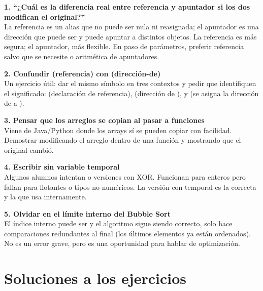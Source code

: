 \documentclass[12pt, oneside]{article}
\begin{document}
\begin{notaprofesor}

\textbf{1. ``¿Cuál es la diferencia real entre referencia y apuntador si los dos modifican el original?''}\\
La referencia es un alias que no puede ser nula ni reasignada; el apuntador es
una dirección que puede ser  y puede apuntar a distintos objetos.
La referencia es más segura; el apuntador, más flexible. En paso de parámetros,
preferir referencia salvo que se necesite  o aritmética de apuntadores.

\vspace{0.6em}
\textbf{2. Confundir  (referencia) con  (dirección-de)}\\
Un ejercicio útil: dar el mismo símbolo en tres contextos y pedir que identifiquen
el significado:  (declaración de referencia), 
(dirección de ), y  (se asigna la dirección de  a ).

\vspace{0.6em}
\textbf{3. Pensar que los arreglos se copian al pasar a funciones}\\
Viene de Java/Python donde los arrays sí se pueden copiar con facilidad. Demostrar
modificando el arreglo dentro de una función y mostrando que el original cambió.

\vspace{0.6em}
\textbf{4. Escribir  sin variable temporal}\\
Algunos alumnos intentan  o versiones con XOR.
Funcionan para enteros pero fallan para flotantes o tipos no numéricos. La versión
con temporal es la correcta y la que usa  internamente.

\vspace{0.6em}
\textbf{5. Olvidar  en el límite interno del Bubble Sort}\\
El índice interno puede ser  y el algoritmo sigue siendo correcto,
solo hace comparaciones redundantes al final (los últimos  elementos
ya están ordenados). No es un error grave, pero es una oportunidad para hablar
de optimización.

\end{notaprofesor}

\section{Soluciones a los ejercicios}
\end{document}
